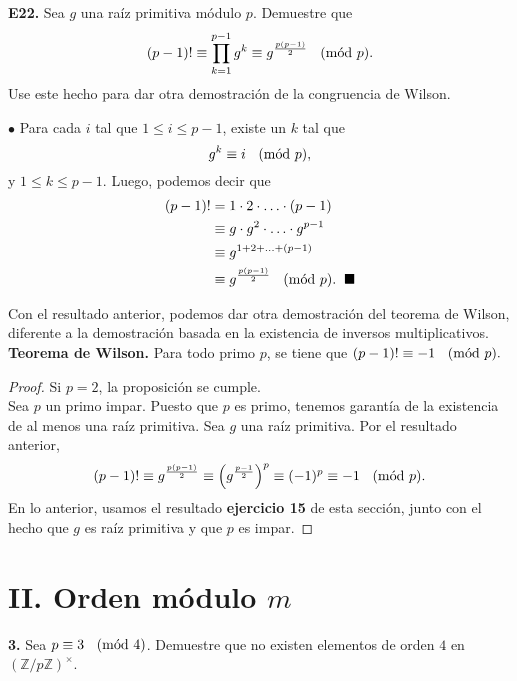 \documentclass{article}
\newcommand{\Mod}[1]{\ \hspace{0.2cm} (\mathrm{m\acute{o}d}\ #1)}
\begin{document}
\begin{mybox}
	\textbf{E22. } Sea $g$ una raíz primitiva módulo $p$. Demuestre que
	$$ (p-1)! \equiv \prod_{k=1}^{p-1} g^{k} \equiv g^{\frac{p(p-1)}{2}} \Mod{p} .$$ 
	Use este hecho para dar otra demostración de la congruencia de Wilson. 
\end{mybox}	

$\bullet$ Para cada $i$ tal que $1 \leq i \leq p -1 $, existe un $k$ tal que 
$$ g^k \equiv i  \Mod{p},$$
y $1 \leq k \leq p - 1.$ Luego, podemos decir que
\begin{equation*}
\begin{split}
(p-1)!  &= 1 \cdot 2 \cdot \ldots \cdot (p-1)  \\
& \equiv g \cdot g^2 \cdot \ldots \cdot g^{p-1}  \\
& \equiv g^{1 + 2 + \ldots + (p-1)}  \\
& \equiv g^{\frac{p(p-1)}{2}} \Mod{p}. \hspace{0.2cm} \blacksquare
\end{split}
\end{equation*}

Con el resultado anterior, podemos dar otra demostración del teorema de Wilson, diferente a la demostración basada en la existencia de inversos multiplicativos. \\

\textbf{Teorema de Wilson. } Para todo primo $p$, se tiene que $(p-1)! \equiv -1 \Mod{p}.$ 
\begin{proof}
	Si $p = 2$, la proposición se cumple. \\
	Sea $p$ un primo impar.  Puesto que $p$ es primo, tenemos garantía de la existencia de al menos una raíz primitiva. Sea $g$ una raíz primitiva. Por el resultado anterior,
	$$(p-1)! \equiv g^{\frac{p(p-1)}{2}} \equiv  \left( g^{\frac{p-1}{2}} \right)^p \equiv (-1)^{p} \equiv -1  \Mod{p}.$$
	En lo anterior, usamos el resultado \textbf{ejercicio 15} de esta sección, junto con  el hecho que $g$ es raíz primitiva y que $p$ es impar. 
\end{proof}
\newpage

\section*{ II. Orden módulo $m$}
\vspace{7mm}
\begin{mybox}
	\textbf{3. } Sea $p \equiv 3 \Mod{4}$. Demuestre que no existen elementos de orden $4$ en $\left(\mathbb{Z}/ p \mathbb{Z} \right)^{\times}$.
\end{mybox}	
\end{document}
